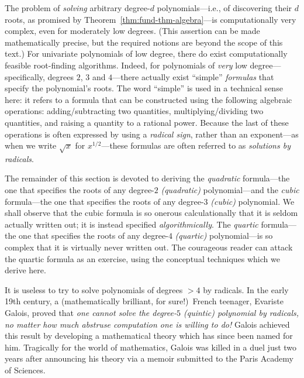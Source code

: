 The problem of {\it solving} arbitrary degree-$d$ polynomials---i.e., of discovering their $d$ roots, as promised by Theorem~\ref{thm:fund-thm-algebra}---is computationally very complex, even for moderately low degrees.  (This assertion can be made mathematically precise, but the required notions are beyond the scope of this text.)  For univariate polynomials of low degree, there do exist computationally feasible root-finding algorithms.  Indeed, for polynomials of {\em very} low degree---specifically, degrees $2$, $3$ and $4$---there actually exist ``simple'' {\em formulas} that specify the polynomial's roots.  The word ``simple'' is used in a technical sense here: it refers to a formula that can be constructed using the following algebraic operations: adding/subtracting two quantities, multiplying/dividing two quantities, and raising a quantity to a rational power.  Because the last of these operations is often expressed by using a {\em radical sign}, rather than an exponent---as when we write $\sqrt{x}$ for $x^{1/2}$---these formulas are often referred to as {\it solutions by radicals}.  
  

  

\medskip

The remainder of this section is devoted to deriving the {\em quadratic} formula---the one that specifies the roots of any degree-$2$ {\it (quadratic)}  polynomial---and the {\em cubic} formula---the one that specifies the roots of any degree-$3$ {\it (cubic)} polynomial.  We shall observe that the cubic formula is so onerous calculationally that it is seldom actually written out; it is instead specified {\em algorithmically}.  The {\em quartic} formula---the one that specifies the roots of any degree-$4$ {\it (quartic)}  polynomial---is so complex that it is virtually never written out.  The courageous reader can attack the quartic formula as an exercise, using the conceptual techniques which we derive here.

   

\smallskip

It is useless to try to solve polynomials of degrees $> 4$ by radicals.  In the early 19th century, a (mathematically brilliant, for sure!)~French teenager, Evariste Galois, proved that {\em one cannot solve the degree-$5$ {\it (quintic)} polynomial by radicals, no matter how much abstruse computation one is willing to do!}  Galois achieved this result by developing a mathematical theory which has since been named for him.  Tragically for the world of mathematics, Galois was killed in a duel just two years after announcing his theory via a memoir submitted to the Paris Academy of Sciences.

